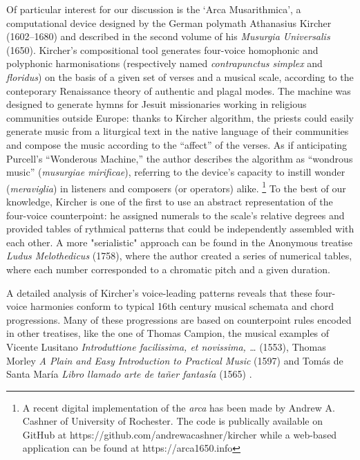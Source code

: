 \documentclass{article}
\begin{document}
Of particular interest for our discussion is the ‘Arca Musarithmica’, a computational device designed by the German polymath Athanasius Kircher (1602–1680) and described in the second volume of his \textit{Musurgia Universalis} (1650).\cite{mckay2015musical} Kircher’s compositional tool generates four-voice homophonic and polyphonic harmonisations (respectively named \textit{contrapunctus simplex} and \textit{floridus}) on the basis of a given set of verses and a musical scale, according to the conteporary Renaissance theory of authentic and plagal modes. The machine was designed to generate hymns for Jesuit missionaries working in religious communities outside Europe: thanks to Kircher algorithm, the priests could easily generate music from a liturgical text in the native language of their communities and compose the music according to the “affect” of the verses.\cite{chierotti1994comporre} As if anticipating Purcell’s “Wonderous Machine,” the author describes the algorithm as “wondrous music” (\textit{musurgiae mirificae}), referring to the device’s capacity to instill wonder (\textit{meraviglia}) in listeners and composers (or operators) alike. \footnote{A recent digital implementation of the \textit{arca} has been made by Andrew A. Cashner of University of Rochester. The code is publically available on GitHub at https://github.com/andrewacashner/kircher while a web-based application can be found at https://arca1650.info}
To the best of our knowledge, Kircher is one of the first to use an abstract representation of the four-voice counterpoint: he assigned numerals to the scale's relative degrees and provided tables of rythmical patterns that could be independently assembled with each other. A more "serialistic" approach can be found in the Anonymous treatise \textit{Ludus Melothedicus} (1758), where the author created a series of numerical tables, where each number corresponded to a chromatic pitch and a given duration.
    
	

A detailed analysis of Kircher's voice-leading patterns reveals that these four-voice harmonies conform to typical 16th century musical schemata and chord progressions. Many of these progressions are based on counterpoint rules encoded in other treatises, like the one of Thomas Campion, the musical examples of Vicente Lusitano \textit{Introduttione facilissima, et novissima, \dots} (1553), \cite{canguilhem2011singing} Thomas Morley \textit{A Plain and Easy Introduction to Practical Music} (1597) \cite{grimshaw2006morley} and Tomás de Santa María \textit{Libro llamado arte de tañer fantasía} (1565) \cite{roig1994modal}. \cite{wegman2014improvising} 
\end{document}
